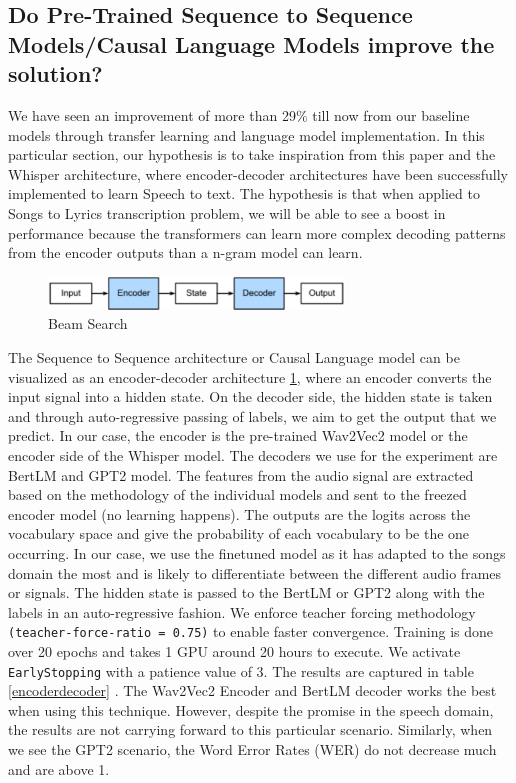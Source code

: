 \subsection{Do Pre-Trained Sequence to Sequence Models/Causal Language Models improve the solution?}

We have seen an improvement of more than 29\% till now from our baseline models through transfer learning and language model implementation. In this particular section, our hypothesis is to take inspiration from this paper \cite{wang2021large} and the Whisper architecture, where encoder-decoder architectures have been successfully implemented to learn Speech to text. The hypothesis is that when applied to Songs to Lyrics transcription problem, we will be able to see a boost in performance because the transformers can learn more complex decoding patterns from the encoder outputs than a n-gram model can learn. 

\begin{figure} [H]
    \centering
    \includegraphics[width=0.7\textwidth]{05-research study/figures/encoder-decoder.pdf}
    \caption{Beam Search \cite{zhang2023dive}}
    \label{fig:encoderdecoder}
\end{figure}



The Sequence to Sequence architecture or Causal Language model can be visualized as an encoder-decoder architecture \ref{fig:encoderdecoder}, where an encoder converts the input signal into a hidden state. On the decoder side, the hidden state is taken and through auto-regressive passing of labels, we aim to get the output that we predict. In our case, the encoder is the pre-trained Wav2Vec2 model or the encoder side of the Whisper model. The decoders we use for the experiment are BertLM  and GPT2 model. The features from the audio signal are extracted based on the methodology of the individual models and sent to the freezed encoder model (no learning happens). The outputs are the logits across the vocabulary space and give the probability of each vocabulary to be the one occurring. In our case, we use the finetuned model as it has adapted to the songs domain the most and is likely to differentiate between the different audio frames or signals. The hidden state is passed to the BertLM or GPT2 along with the labels in an auto-regressive fashion. We enforce teacher forcing methodology \texttt{(teacher-force-ratio = 0.75)} to enable faster convergence. Training is done over 20 epochs and takes 1 GPU around 20 hours to execute. We activate \texttt{EarlyStopping} with a patience value of 3. The results are captured in table \ref{encoderdecoder} . The Wav2Vec2 Encoder and BertLM decoder works the best when using this technique. However, despite the promise in the speech domain, the results are not carrying forward to this particular scenario. Similarly, when we see the GPT2 scenario, the Word Error Rates (WER) do not decrease much and are above 1.

